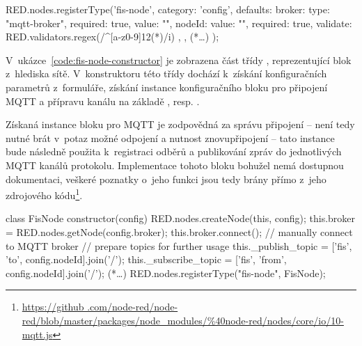 \begin{code}[
    language=Javascript,
    label=code:fis-node-editor,
    caption={Registrace vlastního bloku do editoru sítě v~nástroji Node-RED -- kromě identifikačního klíče do
    registru bloků \ic{\'fis-node\'} se zde nachází definice parametrů a zařazení do konfiguračních bloků
    pomocí zvolené kategorie \ic{\'config\'}.}
]
RED.nodes.registerType('fis-node', {
    category: 'config',
    defaults: {
        broker: {type: "mqtt-broker", required: true, value: ""},
        nodeId: {
            value: "", required: true,
            validate: RED.validators.regex(/^[a-z0-9]{12}(*\textdollar*)/i)
        },
    },
    (*\ldots*)
});
\end{code}

V~ukázce~\ref{code:fis-node-constructor} je zobrazena část třídy , reprezentující blok z~hlediska sítě.
V~konstruktoru této třídy dochází k~získání konfiguračních
parametrů z~formuláře, získání instance konfiguračního bloku pro připojení MQTT a přípravu kanálu na základě
, resp. .

Získaná instance bloku pro MQTT je zodpovědná za správu připojení -- není tedy nutné brát v~potaz možné odpojení a
nutnost znovupřipojení -- tato instance bude následně použita k~registraci odběrů a publikování zpráv do jednotlivých
MQTT kanálů protokolu.
Implementace tohoto bloku bohužel nemá dostupnou dokumentaci, veškeré poznatky o~jeho funkci jsou tedy brány přímo
z~jeho zdrojového kódu\footnote{\url{https://github
.com/node-red/node-red/blob/master/packages/node_modules/\%40node-red/nodes/core/io/10-mqtt.js}}.

\begin{code}[
    language=Javascript,
    label=code:fis-node-constructor,
    caption={Část konstruktoru třídy \ic{FisNode} obsluhující připojení brokeru MQTT a přípravu kanálů pro komunikaci.
    Důležitá je příprava části kanálů, které jsou následně použity pro publikování a odběr zpráv -- v~atributu
    \ic{_publish_topic} je uložen kanál s~identifikací uzlu, identifikace aplikace, dle kapitoly~\ref{sec:mqtt-kanaly}, připojí
    třída až při publikování pro konkrétní aplikaci. Druhým předpřipraveným kanálem je kanál pro odběr zprávy z~uzlu
    -- ten je uložen v~atributu \ic{_subscribe_topic}.}
]
class FisNode {
    constructor(config) {
        RED.nodes.createNode(this, config);
        this.broker = RED.nodes.getNode(config.broker);
        this.broker.connect(); // manually connect to MQTT broker
        // prepare topics for further usage
        this._publish_topic = ['fis', 'to', config.nodeId].join('/');
        this._subscribe_topic = ['fis', 'from', config.nodeId].join('/');
    }
    (*\ldots*)
    RED.nodes.registerType("fis-node", FisNode);
}
\end{code}

